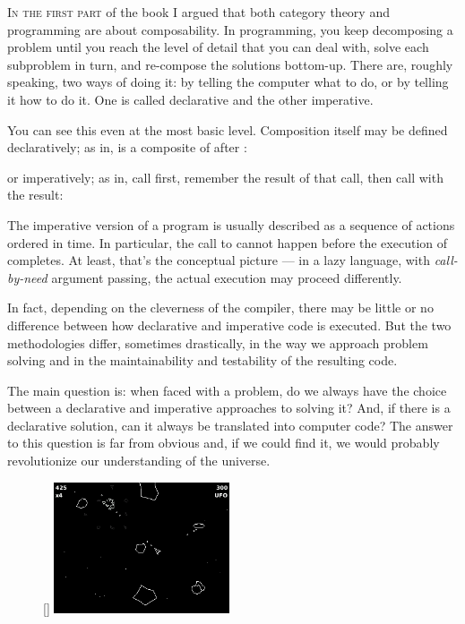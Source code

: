 
\lettrine[lhang=0.17]{I}{n the first part} of the book I argued that both category theory and
programming are about composability. In programming, you keep
decomposing a problem until you reach the level of detail that you can
deal with, solve each subproblem in turn, and re-compose the solutions
bottom-up. There are, roughly speaking, two ways of doing it: by telling
the computer what to do, or by telling it how to do it. One is called
declarative and the other imperative.

You can see this even at the most basic level. Composition itself may be
defined declaratively; as in,  is a composite of 
after :

or imperatively; as in, call  first, remember the result of
that call, then call  with the result:

The imperative version of a program is usually described as a sequence
of actions ordered in time. In particular, the call to  cannot
happen before the execution of  completes. At least, that's
the conceptual picture --- in a lazy language, with \emph{call-by-need}
argument passing, the actual execution may proceed differently.

In fact, depending on the cleverness of the compiler, there may be
little or no difference between how declarative and imperative code is
executed. But the two methodologies differ, sometimes drastically, in
the way we approach problem solving and in the maintainability and
testability of the resulting code.

The main question is: when faced with a problem, do we always have the
choice between a declarative and imperative approaches to solving it?
And, if there is a declarative solution, can it always be translated
into computer code? The answer to this question is far from obvious and,
if we could find it, we would probably revolutionize our understanding
of the universe.

\begin{figure}
\raisebox{0pt}[\dimexpr{}\baselineskip\relax]{
\includegraphics[width=0.46\textwidth]{images/asteroids.png}}
\end{figure}

